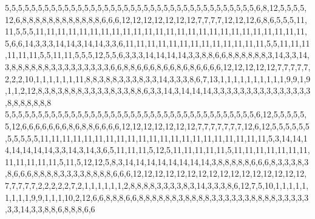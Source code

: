 5,5,5,5,5,5,5,5,5,5,5,5,5,5,5,5,5,5,5,5,5,5,5,5,5,5,5,5,5,5,5,5,5,5,5,5,5,5,6,8,12,5,5,5,5,12,6,8,8,8,8,8,8,8,8,8,8,8,8,6,6,6,12,12,12,12,12,12,12,7,7,7,7,12,12,12,6,8,6,5,5,5,11,11,5,5,5,11,11,11,11,11,11,11,11,11,11,11,11,11,11,11,11,11,11,11,11,11,11,11,11,11,5,6,6,14,3,3,3,14,14,3,14,14,3,3,6,11,11,11,11,11,11,11,11,11,11,11,11,11,5,5,11,11,11,11,11,11,5,5,11,11,5,5,5,12,5,5,6,3,3,3,14,14,14,14,3,3,8,8,6,6,8,8,8,8,8,8,3,14,3,3,14,3,8,8,8,8,8,8,3,3,3,3,3,3,3,3,3,6,6,8,8,6,6,6,8,6,6,8,6,8,6,6,6,6,12,12,12,12,12,7,7,7,7,7,2,2,2,10,1,1,1,1,1,1,11,8,8,3,8,8,3,3,3,8,3,3,14,3,3,3,8,6,7,13,1,1,1,1,1,1,1,1,1,1,9,9,1,9,1,1,2,12,8,3,8,3,8,8,8,3,3,3,3,8,3,3,8,8,6,3,3,14,3,14,14,14,3,3,3,3,3,3,3,3,3,3,3,3,3,3,3,8,8,8,8,8,8,8
5,5,5,5,5,5,5,5,5,5,5,5,5,5,5,5,5,5,5,5,5,5,5,5,5,5,5,5,5,5,5,5,5,5,5,5,5,5,6,12,5,5,5,5,5,5,12,6,6,6,6,6,6,6,8,6,8,8,6,6,6,6,12,12,12,12,12,12,12,7,7,7,7,7,7,7,12,6,12,5,5,5,5,5,5,5,5,5,5,5,11,11,11,11,11,11,11,11,11,11,11,11,11,11,11,11,11,11,11,11,11,5,3,14,14,14,14,14,14,14,3,3,14,3,14,3,6,5,11,11,11,5,12,5,11,11,11,11,11,5,11,11,11,11,11,11,11,11,11,11,11,11,5,11,5,12,12,5,8,3,14,14,14,14,14,14,14,14,3,8,8,8,8,8,6,6,6,8,3,3,3,8,3,8,6,6,6,8,8,8,8,3,3,3,3,8,8,8,8,6,6,6,12,12,12,12,12,12,12,12,12,12,12,12,12,12,12,12,7,7,7,7,7,2,2,2,2,2,7,2,1,1,1,1,1,1,2,8,8,8,8,3,3,3,3,8,3,14,3,3,3,8,6,12,7,5,10,1,1,1,1,1,1,1,1,1,9,9,1,1,1,10,2,12,6,6,8,8,8,6,6,8,8,8,8,8,8,3,8,8,8,8,3,3,3,3,3,3,8,8,8,8,3,3,3,3,3,3,3,14,3,3,8,8,6,8,8,8,6,6
